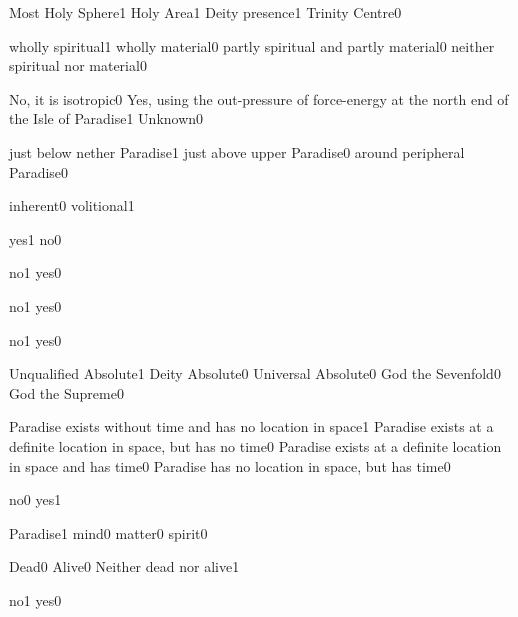 {Most Holy Sphere}{1}
{Holy Area}{1}
{Deity presence}{1}
{Trinity Centre}{0}
\qstop

{wholly spiritual}{1}
{wholly material}{0}
{partly spiritual and partly material}{0}
{neither spiritual nor material}{0}
\qstop

{No, it is isotropic}{0}
{Yes, using the out-pressure of force-energy at the north end of the Isle of Paradise}{1}
{Unknown}{0}
\qstop

{just below nether Paradise}{1}
{just above upper Paradise}{0}
{around peripheral Paradise}{0}
\qstop

{inherent}{0}
{volitional}{1}
\qstop

{yes}{1}
{no}{0}
\qstop

{no}{1}
{yes}{0}
\qstop

{no}{1}
{yes}{0}
\qstop

{no}{1}
{yes}{0}
\qstop

{Unqualified Absolute}{1}
{Deity Absolute}{0}
{Universal Absolute}{0}
{God the Sevenfold}{0}
{God the Supreme}{0}
\qstop

{Paradise exists without time and has no location in space}{1}
{Paradise exists at a definite location in space, but has no time}{0}
{Paradise exists at a definite location in space and has time}{0}
{Paradise has no location in space, but has time}{0}
\qstop

{no}{0}
{yes}{1}
\qstop

{Paradise}{1}
{mind}{0}
{matter}{0}
{spirit}{0}
\qstop

{Dead}{0}
{Alive}{0}
{Neither dead nor alive}{1}
\qstop

{no}{1}
{yes}{0}
\qstop

